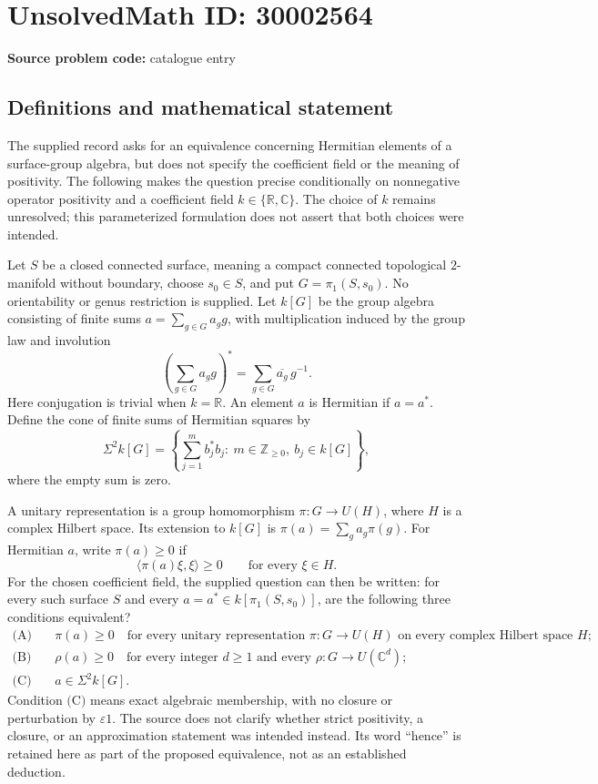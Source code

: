 \documentclass[11pt]{article}
\newcommand{\Z}{\mathbb{Z}}
\newcommand{\R}{\mathbb{R}}
\newcommand{\C}{\mathbb{C}}
\begin{document}
\section*{UnsolvedMath ID: 30002564}
\textbf{Source problem code:} catalogue entry
\subsection{Definitions and mathematical statement}
The supplied record asks for an equivalence concerning Hermitian elements of a surface-group algebra, but does not specify the coefficient field or the meaning of positivity. The following makes the question precise conditionally on nonnegative operator positivity and a coefficient field \(k\in\{\R,\C\}\). The choice of \(k\) remains unresolved; this parameterized formulation does not assert that both choices were intended.

Let \(S\) be a closed connected surface, meaning a compact connected topological \(2\)-manifold without boundary, choose \(s_0\in S\), and put \(G=\pi_1(S,s_0)\). No orientability or genus restriction is supplied. Let \(k[G]\) be the group algebra consisting of finite sums \(a=\sum_{g\in G}a_g g\), with multiplication induced by the group law and involution
\[
\left(\sum_{g\in G}a_g g\right)^*=\sum_{g\in G}\overline{a_g}\,g^{-1}.
\]
Here conjugation is trivial when \(k=\R\). An element \(a\) is Hermitian if \(a=a^*\). Define the cone of finite sums of Hermitian squares by
\[
\Sigma^2 k[G]=\left\{\sum_{j=1}^{m}b_j^*b_j:\ m\in\Z_{\geq 0},\ b_j\in k[G]\right\},
\]
where the empty sum is zero.

A unitary representation is a group homomorphism \(\pi:G\to U(H)\), where \(H\) is a complex Hilbert space. Its extension to \(k[G]\) is \(\pi(a)=\sum_g a_g\pi(g)\). For Hermitian \(a\), write \(\pi(a)\geq0\) if
\[
\langle\pi(a)\xi,\xi\rangle\geq0\qquad\text{for every }\xi\in H.
\]
For the chosen coefficient field, the supplied question can then be written: for every such surface \(S\) and every \(a=a^*\in k[\pi_1(S,s_0)]\), are the following three conditions equivalent?
\begin{align*}
\text{(A)}\quad&\pi(a)\geq0\quad\text{for every unitary representation }\pi:G\to U(H)\text{ on every complex Hilbert space }H;\\
\text{(B)}\quad&\rho(a)\geq0\quad\text{for every integer }d\geq1\text{ and every }\rho:G\to U(\C^d);\\
\text{(C)}\quad&a\in\Sigma^2 k[G].
\end{align*}
Condition \(\text{(C)}\) means exact algebraic membership, with no closure or perturbation by \(\varepsilon 1\). The source does not clarify whether strict positivity, a closure, or an approximation statement was intended instead. Its word ``hence'' is retained here as part of the proposed equivalence, not as an established deduction.
\end{document}
